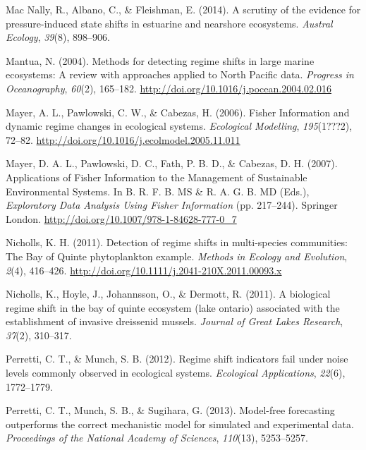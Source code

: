 \documentclass[12pt,twoside,openany]{reedthesis}
\begin{document}
\hypertarget{ref-mac2014scrutiny}{}
Mac Nally, R., Albano, C., \& Fleishman, E. (2014). A scrutiny of the
evidence for pressure-induced state shifts in estuarine and nearshore
ecosystems. \emph{Austral Ecology}, \emph{39}(8), 898--906.

\hypertarget{ref-mantua_methods_2004}{}
Mantua, N. (2004). Methods for detecting regime shifts in large marine
ecosystems: A review with approaches applied to North Pacific data.
\emph{Progress in Oceanography}, \emph{60}(2), 165--182.
\url{http://doi.org/10.1016/j.pocean.2004.02.016}

\hypertarget{ref-mayer_fisher_2006}{}
Mayer, A. L., Pawlowski, C. W., \& Cabezas, H. (2006). Fisher
Information and dynamic regime changes in ecological systems.
\emph{Ecological Modelling}, \emph{195}(1???2), 72--82.
\url{http://doi.org/10.1016/j.ecolmodel.2005.11.011}

\hypertarget{ref-mayer_applications_2007}{}
Mayer, D. A. L., Pawlowski, D. C., Fath, P. B. D., \& Cabezas, D. H.
(2007). Applications of Fisher Information to the Management of
Sustainable Environmental Systems. In B. R. F. B. MS \& R. A. G. B. MD
(Eds.), \emph{Exploratory Data Analysis Using Fisher Information} (pp.
217--244). Springer London.
\url{http://doi.org/10.1007/978-1-84628-777-0_7}

\hypertarget{ref-nicholls_detection_2011}{}
Nicholls, K. H. (2011). Detection of regime shifts in multi-species
communities: The Bay of Quinte phytoplankton example. \emph{Methods in
Ecology and Evolution}, \emph{2}(4), 416--426.
\url{http://doi.org/10.1111/j.2041-210X.2011.00093.x}

\hypertarget{ref-nicholls2011biological}{}
Nicholls, K., Hoyle, J., Johannsson, O., \& Dermott, R. (2011). A
biological regime shift in the bay of quinte ecosystem (lake ontario)
associated with the establishment of invasive dreissenid mussels.
\emph{Journal of Great Lakes Research}, \emph{37}(2), 310--317.

\hypertarget{ref-perretti2012regime}{}
Perretti, C. T., \& Munch, S. B. (2012). Regime shift indicators fail
under noise levels commonly observed in ecological systems.
\emph{Ecological Applications}, \emph{22}(6), 1772--1779.

\hypertarget{ref-perretti_model-free_2013}{}
Perretti, C. T., Munch, S. B., \& Sugihara, G. (2013). Model-free
forecasting outperforms the correct mechanistic model for simulated and
experimental data. \emph{Proceedings of the National Academy of
Sciences}, \emph{110}(13), 5253--5257.
\end{document}

